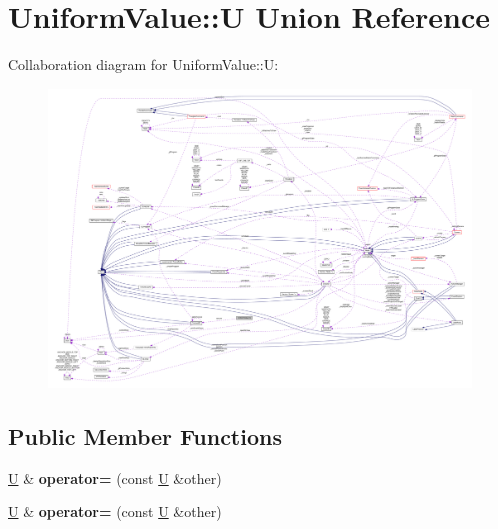 \hypertarget{unionUniformValue_1_1U}{}\section{Uniform\+Value\+:\+:U Union Reference}
\label{unionUniformValue_1_1U}


Collaboration diagram for Uniform\+Value\+:\+:U\+:
\nopagebreak
\begin{figure}[H]
\begin{center}
\leavevmode
\includegraphics[width=350pt]{unionUniformValue_1_1U__coll__graph}
\end{center}
\end{figure}
\subsection*{Public Member Functions}
\begin{DoxyCompactItemize}
\item 
\mbox{\label{unionUniformValue_1_1U_afc8f8e0e27669e67402d02505112a150}} 
\hyperlink{unionUniformValue_1_1U}{U} \& {\bfseries operator=} (const \hyperlink{unionUniformValue_1_1U}{U} \&other)
\item 
\mbox{\label{unionUniformValue_1_1U_afc8f8e0e27669e67402d02505112a150}} 
\hyperlink{unionUniformValue_1_1U}{U} \& {\bfseries operator=} (const \hyperlink{unionUniformValue_1_1U}{U} \&other)
\end{DoxyCompactItemize}

